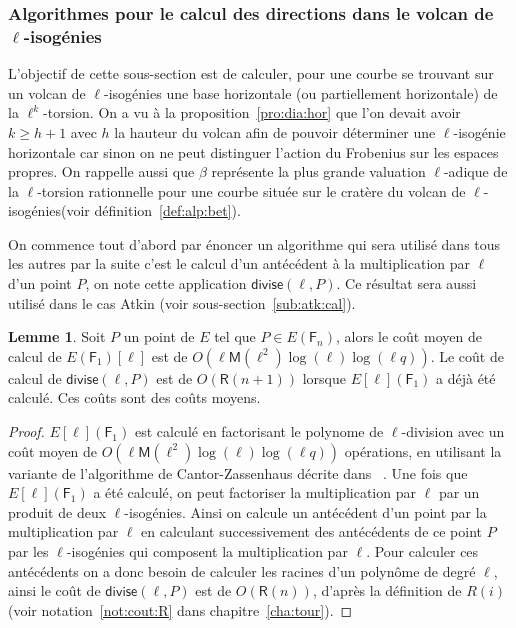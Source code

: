 \documentclass[10pt,a4paper]{book}
\theoremstyle{plain}
\theoremstyle{definition}
\newtheorem{lem}[thm]{Lemme}
\theoremstyle{definition}
\theoremstyle{definition}
\theoremstyle{definition}
\theoremstyle{remark}
\theoremstyle{remark}
\theoremstyle{definition}
\begin{document}
\subsubsection{Algorithmes pour le calcul des directions dans le volcan de $\ell$-isogénies}

L'objectif de cette sous-section est de calculer, pour une courbe se trouvant 
sur un volcan de $\ell$-isogénies une base horizontale (ou partiellement 
horizontale) de la $\ell^k$-torsion. On a vu à la proposition~\ref{pro:dia:hor}
que l'on devait avoir $k \geqslant h+1$ avec $h$ la hauteur du volcan afin de 
pouvoir déterminer une $\ell$-isogénie horizontale car sinon on ne peut 
distinguer l'action du Frobenius sur les espaces propres. On 
rappelle aussi que $\beta$ représente la plus grande valuation $\ell$-adique de
la $\ell$-torsion rationnelle pour une courbe située sur le cratère du volcan 
de $\ell$-isogénies(voir définition~\ref{def:alp:bet}).

On commence tout d'abord par énoncer un algorithme qui sera utilisé dans tous 
les autres par la suite c'est le calcul d'un antécédent à la 
multiplication par $\ell$ d'un point $P$, on note cette application 
$\mathsf{divise}(\ell,P)$. Ce résultat sera aussi utilisé dans le cas Atkin 
(voir sous-section~\ref{sub:atk:cal}).

\begin{lem}
\label{lem:div:cou}
Soit $P$ un point de $E$ tel que $P \in E(\mathsf{F}_{n})$, alors le coût moyen
de calcul de $E(\mathsf{F}_1)[\ell]$ est de $O(\ell \mathsf{M}(\ell^2)
\log(\ell)\log(\ell q))$. Le coût de calcul de $\mathsf{divise}(\ell,P)$ est de
$O(\mathsf{R}(n+1))$ lorsque $E[\ell](\mathsf{F}_1)$ a déjà été calculé. Ces 
coûts sont des coûts moyens.
\end{lem}

\begin{proof}
$E[\ell](\mathsf{F}_1)$ est calculé en factorisant le polynome de 
$\ell$-division 
avec un coût moyen de $O(\ell \mathsf{M}(\ell^2)\log(\ell)\log(\ell q))$
opérations, en utilisant la variante de l'algorithme de Cantor-Zassenhaus 
décrite dans ~\cite[Chapter~14.5]{vzGJG03}.
 Une fois que $E[\ell](\mathsf{F}_1)$ a été calculé, on peut factoriser la
 multiplication par $\ell$ par un produit de deux $\ell$-isogénies. Ainsi on
 calcule un antécédent d'un point par la multiplication par $\ell$ en 
 calculant successivement des antécédents de ce point $P$ par les 
 $\ell$-isogénies qui composent la multiplication par $\ell$. Pour calculer 
 ces antécédents on a donc besoin de calculer les racines d'un polynôme de 
 degré $\ell$, ainsi le coût de $\mathsf{divise}(\ell,P)$ est de 
 $O(\mathsf{R}(n))$, d'après la définition de $R(i)$  (voir notation~\ref{not:cout:R} 
 dans chapitre~\ref{cha:tour}).  
\end{proof}
\end{document}
